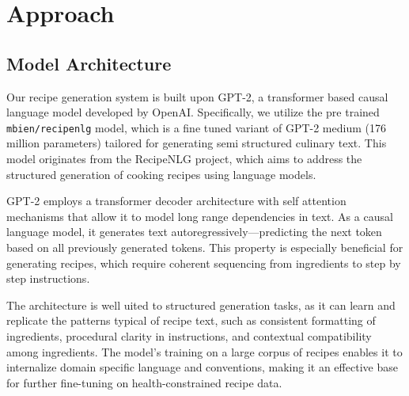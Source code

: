 \section{Approach}

\subsection{Model Architecture}

Our recipe generation system is built upon GPT-2, a transformer based causal language model developed by OpenAI. Specifically, we utilize the pre trained \texttt{mbien/recipenlg} model, which is a fine tuned variant of GPT-2 medium (176 million parameters) tailored for generating semi structured culinary text. This model originates from the RecipeNLG project, which aims to address the structured generation of cooking recipes using language models.

GPT-2 employs a transformer decoder architecture with self attention mechanisms that allow it to model long range dependencies in text. As a causal language model, it generates text autoregressively—predicting the next token based on all previously generated tokens. This property is especially beneficial for generating recipes, which require coherent sequencing from ingredients to step by step instructions.

The architecture is well uited to structured generation tasks, as it can learn and replicate the patterns typical of recipe text, such as consistent formatting of ingredients, procedural clarity in instructions, and contextual compatibility among ingredients. The model's training on a large corpus of recipes enables it to internalize domain specific language and conventions, making it an effective base for further fine-tuning on health-constrained recipe data.
